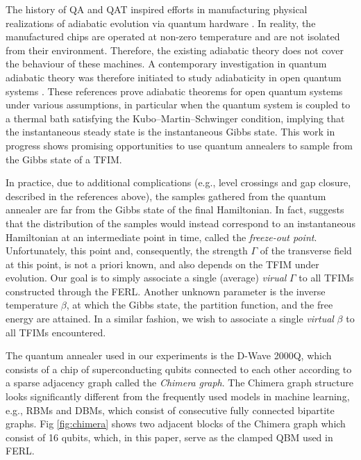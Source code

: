 \documentclass[pra,twocolumn,floatfix,superscriptaddress]{revtex4}
\begin{document}
The history of QA and QAT inspired efforts in manufacturing physical realizations of adiabatic evolution via quantum hardware \cite{dwnature}. In reality, the manufactured chips are operated at non-zero temperature and are not isolated from their environment. Therefore, the existing adiabatic theory does not cover the behaviour of these machines. A contemporary investigation in quantum adiabatic theory was therefore initiated to study adiabaticity in open quantum systems \cite{PhysRevA.71.012331, PhysRevA.93.032118, 136726301412123016, Avron2012, 2016arXiv161201505B}. These references prove adiabatic theorems for open quantum systems under various assumptions, in particular when the quantum system is coupled to a thermal bath satisfying the Kubo--Martin--Schwinger condition, implying that the instantaneous steady state is the instantaneous Gibbs state. This work in progress shows promising opportunities to use quantum annealers to sample from the Gibbs state of a TFIM. 

In practice, due to additional complications (e.g., level crossings and gap closure, described in the references above), the samples gathered from the quantum annealer are far from the Gibbs state of the final Hamiltonian. In fact, \cite{amin2015searching} suggests that the distribution of the samples would instead correspond to an instantaneous Hamiltonian at an intermediate point in time, called the \emph{freeze-out point}. Unfortunately, this point and, consequently, the strength $\Gamma$ of the transverse field at this point, is not a priori known, and also depends on the TFIM under evolution. Our goal is to simply associate a single (average) \emph{virual} $\Gamma$ to all TFIMs constructed through the FERL. Another unknown parameter is the inverse temperature $\beta$, at which the Gibbs state, the partition function, and the free energy are attained. In a similar fashion, we wish to associate a single \emph{virtual} $\beta$ to all TFIMs encountered. 
 
The quantum annealer used in our experiments is the D-Wave 2000Q, which consists of a chip of superconducting qubits connected to each other according to a sparse adjacency graph called the \emph{Chimera graph}. The Chimera graph structure looks significantly different from the frequently used models in machine learning, e.g., RBMs and DBMs, which consist of consecutive fully connected bipartite graphs. Fig \ref{fig:chimera} shows two adjacent blocks of the Chimera graph which consist of 16 qubits, which, in this paper, serve as the clamped QBM used in FERL.  
\end{document}
